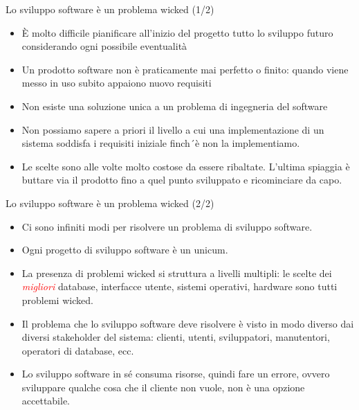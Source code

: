 \documentclass{beamer}
\begin{document}
\begin{frame}{\centerline{Lo sviluppo software \`{e} un problema wicked (1/2)}}

\small
\begin{itemize}
\item \`{E} molto difficile pianificare all'inizio del progetto tutto lo sviluppo futuro considerando ogni possibile eventualit\`{a}

\item Un prodotto software non \`{e} praticamente mai perfetto o finito: quando viene messo in uso subito appaiono nuovo requisiti

\item Non esiste una soluzione unica a un problema di ingegneria del software

\item Non possiamo sapere a priori il livello a cui una implementazione di un sistema soddisfa i requisiti iniziale finch´\`{e} non la implementiamo.

\item Le scelte sono alle volte molto costose da essere ribaltate. L'ultima spiaggia è buttare via il prodotto fino a quel punto sviluppato e ricominciare da capo.

\end{itemize}

\end{frame}
\begin{frame}{\centerline{Lo sviluppo software \`{e} un problema wicked (2/2)}}

\small 
\begin{itemize}
\item Ci sono infiniti modi per risolvere un problema di sviluppo software.

\item Ogni progetto di sviluppo software \`{e} un unicum.

\item La presenza di problemi wicked si struttura a livelli multipli: le scelte dei \textcolor{red}{\textit{migliori}} database, interfacce utente, sistemi operativi, hardware sono tutti problemi wicked.

\item Il problema che lo sviluppo software deve risolvere \`{e} visto in modo diverso dai diversi stakeholder del sistema: clienti, utenti, sviluppatori, manutentori, operatori di database, ecc.

\item Lo sviluppo software in s\'{e} consuma risorse, quindi fare un errore, ovvero sviluppare qualche cosa che il cliente non vuole, non \`{e} una opzione accettabile.

\end{itemize}

\end{frame}
\end{document}
